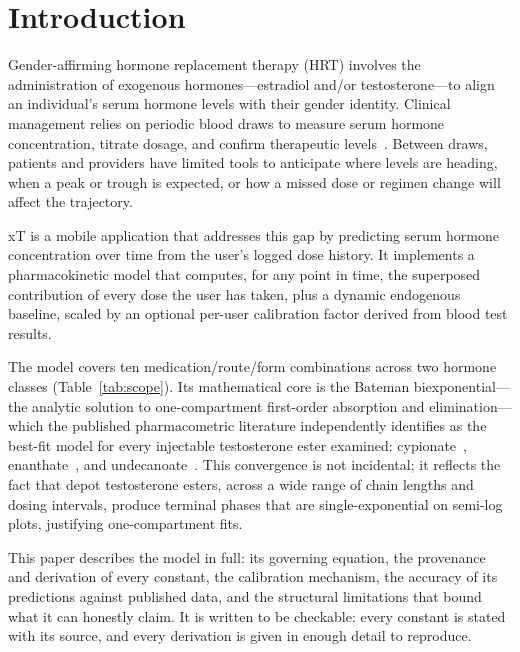 \documentclass[11pt,a4paper]{article}
\begin{document}
\tableofcontents
\clearpage

\section{Introduction}
\label{sec:intro}

Gender-affirming hormone replacement therapy (HRT) involves the
administration of exogenous hormones---estradiol and/or
testosterone---to align an individual's serum hormone levels with their
gender identity. Clinical management relies on periodic blood draws to
measure serum hormone concentration, titrate dosage, and confirm
therapeutic levels~\cite{hembree2017}. Between draws, patients and
providers have limited tools to anticipate where levels are heading,
when a peak or trough is expected, or how a missed dose or regimen
change will affect the trajectory.

xT is a mobile application that addresses this gap by predicting serum
hormone concentration over time from the user's logged dose history. It
implements a pharmacokinetic model that computes, for any point in time,
the superposed contribution of every dose the user has taken, plus a
dynamic endogenous baseline, scaled by an optional per-user calibration
factor derived from blood test results.

The model covers ten medication/route/form combinations across two
hormone classes (Table~\ref{tab:scope}). Its mathematical core is the
Bateman biexponential---the analytic solution to one-compartment
first-order absorption and elimination---which the published
pharmacometric literature independently identifies as the best-fit model
for every injectable testosterone ester examined: cypionate~\cite{bi2018},
enanthate~\cite{ichihara2020}, and
undecanoate~\cite{pastuszak2021}. This convergence is not incidental;
it reflects the fact that depot testosterone esters, across a wide range
of chain lengths and dosing intervals, produce terminal phases that are
single-exponential on semi-log plots, justifying one-compartment fits.

This paper describes the model in full: its governing equation, the
provenance and derivation of every constant, the calibration mechanism,
the accuracy of its predictions against published data, and the
structural limitations that bound what it can honestly claim. It is
written to be checkable: every constant is stated with its source, and
every derivation is given in enough detail to reproduce.
\end{document}
